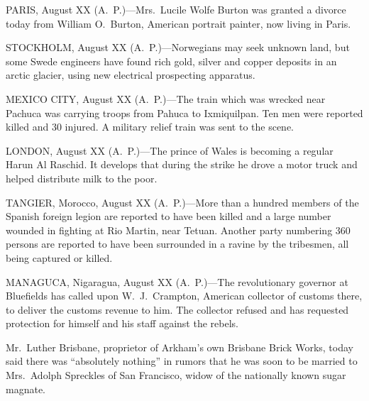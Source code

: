 \documentclass{newspaper1920}
\begin{document}
\begin{multicols}{3}


PARIS, August XX (A.~P.)---Mrs.~Lucile Wolfe Burton was granted a
divorce today from William O.\ Burton, American portrait painter, now
living in Paris.

\halfrule


STOCKHOLM, August XX (A.~P.)---Norwegians may seek unknown land, but
some Swede engineers have found rich gold, silver and copper deposits
in an arctic glacier, using new electrical prospecting apparatus.

\halfrule


MEXICO CITY, August XX (A.~P.)---The train which was wrecked near
Pachuca was carrying troops from Pahuca to Ixmiquilpan.  Ten men were
reported killed and 30 injured.  A military relief train was sent to
the scene.

\halfrule


LONDON, August XX (A.~P.)---The prince of Wales is becoming a regular
Harun Al Raschid.  It develops that during the strike he drove a motor
truck and helped distribute milk to the poor.

\halfrule


TANGIER, Morocco, August XX (A.~P.)---More than a hundred members of
the Spanish foreign legion are reported to have been killed and a
large number wounded in fighting at Rio Martin, near Tetuan.  Another
party numbering 360 persons are reported to have been surrounded in a
ravine by the tribesmen, all being captured or killed.

\halfrule


MANAGUCA, Nigaragua, August XX (A.~P.)---The revolutionary governor at
Bluefields has called upon W.~J.~Crampton, American collector of
customs there, to deliver the customs revenue to him.  The collector
refused and has requested protection for himself and his staff against
the rebels.

\fullrule


Mr.~Luther Brisbane, proprietor of Arkham's own Brisbane Brick Works,
today said there was ``absolutely nothing'' in rumors that he was soon
to be married to Mrs.~Adolph Spreckles of San Francisco, widow of the
nationally known sugar magnate.


\end{multicols}
\end{document}
